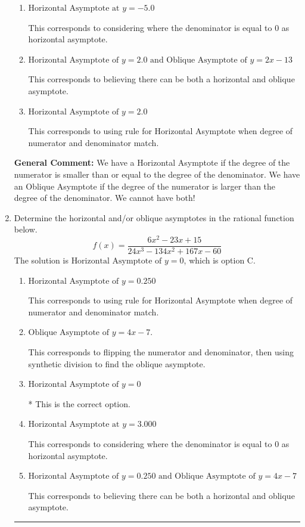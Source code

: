 \documentclass{extbook}[14pt]
\newcommand{\litem}[1]{\item #1

\rule{\textwidth}{0.4pt}}
\begin{document}
\begin{enumerate}
{\begin{enumerate}[label=\Alph*.]
This is the correct answer.
\item \( \text{Horizontal Asymptote at } y = -5.0 \)

This corresponds to considering where the denominator is equal to 0 as horizontal asymptote.
\item \( \text{Horizontal Asymptote of } y = 2.0 \text{ and Oblique Asymptote of } y = 2x -13 \)

This corresponds to believing there can be both a horizontal and oblique asymptote.
\item \( \text{Horizontal Asymptote of } y = 2.0  \)

This corresponds to using rule for Horizontal Asymptote when degree of numerator and denominator match.
\end{enumerate}

\textbf{General Comment:} We have a Horizontal Asymptote if the degree of the numerator is smaller than or equal to the degree of the denominator. We have an Oblique Asymptote if the degree of the numerator is larger than the degree of the denominator. We cannot have both!
}
\litem{
Determine the horizontal and/or oblique asymptotes in the rational function below.
\[ f(x) = \frac{6x^{2} -23 x + 15}{24x^{3} -134 x^{2} +167 x -60} \]The solution is \( \text{Horizontal Asymptote of } y = 0 \), which is option C.\begin{enumerate}[label=\Alph*.]
\item \( \text{Horizontal Asymptote of } y = 0.250  \)

This corresponds to using rule for Horizontal Asymptote when degree of numerator and denominator match.
\item \( \text{Oblique Asymptote of } y = 4x -7. \)

This corresponds to flipping the numerator and denominator, then using synthetic division to find the oblique asymptote.
\item \( \text{Horizontal Asymptote of } y = 0 \)

* This is the correct option.
\item \( \text{Horizontal Asymptote at } y = 3.000 \)

This corresponds to considering where the denominator is equal to 0 as horizontal asymptote.
\item \( \text{Horizontal Asymptote of } y = 0.250 \text{ and Oblique Asymptote of } y = 4x -7 \)

This corresponds to believing there can be both a horizontal and oblique asymptote.
\end{enumerate}

}
\end{enumerate}
\end{document}

